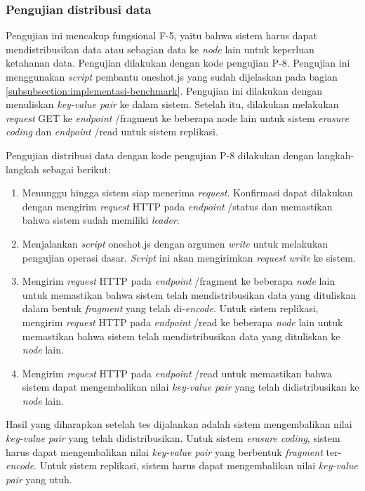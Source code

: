 \subsubsection{Pengujian distribusi data}
\label{subsubsection:pengujian-distribusi-data}

Pengujian ini mencakup fungsional F-5, yaitu bahwa sistem harus dapat mendistribusikan data atau sebagian data ke \textit{node} lain untuk keperluan ketahanan data. Pengujian dilakukan dengan kode pengujian P-8. Pengujian ini menggunakan \textit{script} pembantu oneshot.js yang sudah dijelaskan pada bagian \ref{subsubsection:implementasi-benchmark}. Pengujian ini dilakukan dengan menuliskan \textit{key-value pair} ke dalam sistem. Setelah itu, dilakukan melakukan \textit{request} GET ke \textit{endpoint} /fragment ke beberapa node lain untuk sistem \textit{erasure coding} dan \textit{endpoint} /read untuk sistem replikasi.

Pengujian distribusi data dengan kode pengujian P-8 dilakukan dengan langkah-langkah sebagai berikut:
\begin{enumerate}
    \item Menunggu hingga sistem siap menerima \textit{request}. Konfirmasi dapat dilakukan dengan mengirim \textit{request} HTTP pada \textit{endpoint} /status dan memastikan bahwa sistem sudah memiliki \textit{leader}.
    \item Menjalankan \textit{script} oneshot.js dengan argumen \textit{write} untuk melakukan pengujian operasi dasar. \textit{Script} ini akan mengirimkan \textit{request} \textit{write} ke sistem.
    \item Mengirim \textit{request} HTTP pada \textit{endpoint} /fragment ke beberapa \textit{node} lain untuk memastikan bahwa sistem telah mendistribusikan data yang dituliskan dalam bentuk \textit{fragment} yang telah di-\textit{encode}. Untuk sistem replikasi, mengirim \textit{request} HTTP pada \textit{endpoint} /read ke beberapa \textit{node} lain untuk memastikan bahwa sistem telah mendistribusikan data yang dituliskan ke \textit{node} lain.
    \item Mengirim \textit{request} HTTP pada \textit{endpoint} /read untuk memastikan bahwa sistem dapat mengembalikan nilai \textit{key-value pair} yang telah didistribusikan ke \textit{node} lain.
\end{enumerate}

Hasil yang diharapkan setelah tes dijalankan adalah sistem mengembalikan nilai \textit{key-value pair} yang telah didistribusikan. Untuk sistem \textit{erasure coding}, sistem harus dapat mengembalikan nilai \textit{key-value pair} yang berbentuk \textit{fragment} ter-\textit{encode}. Untuk sistem replikasi, sistem harus dapat mengembalikan nilai \textit{key-value pair} yang utuh.